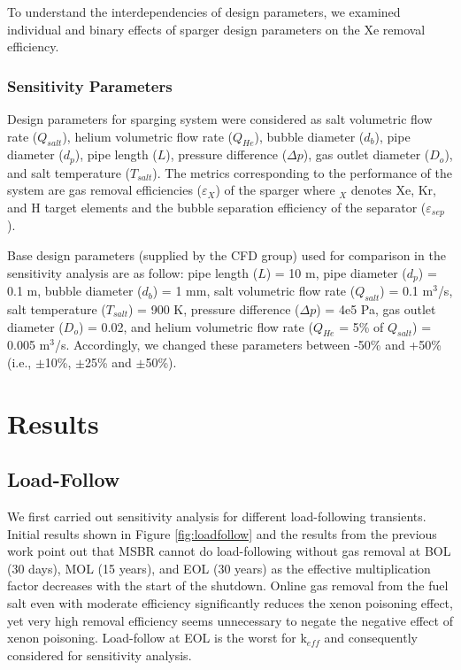 \begin{itemize}
    To understand the interdependencies of design parameters, we examined 
    individual and binary effects of sparger design parameters on the Xe 
    removal efficiency.

\subsubsection{Sensitivity Parameters}

    Design parameters for sparging system were considered as salt volumetric 
    flow rate ($Q_{salt}$), helium volumetric flow rate ($Q_{He}$), bubble 
    diameter ($d_b$), pipe diameter ($d_p$), pipe length ($L$), pressure 
    difference ($\Delta p$), gas outlet diameter ($D_o$), and salt temperature 
    ($T_{salt}$). The metrics corresponding to the performance of the system 
    are gas removal efficiencies ($\varepsilon$$_{X}$) of the sparger where 
    $_{X}$ denotes Xe, Kr, and H target elements and the bubble separation 
    efficiency of the separator ($\varepsilon$$_{sep}$).

    Base design parameters (supplied by the CFD group) used for comparison in 
    the sensitivity analysis are as follow: pipe length ($L$) = 10 m, pipe 
    diameter ($d_p$) = 0.1 m, bubble diameter ($d_b$) = 1 mm, salt volumetric 
    flow rate ($Q_{salt}$) = 0.1 m$^{3}$/s, salt temperature ($T_{salt}$) = 900 
    K, pressure difference ($\Delta p$) = 4e5 Pa, gas outlet diameter ($D_o$) = 
    0.02, and helium volumetric flow rate ($Q_{He}$ = 5\% of $Q_{salt}$) = 
    0.005 m$^{3}$/s. Accordingly, we changed these parameters between -50\% and 
    +50\% (i.e., $\pm$10\%, $\pm$25\% and $\pm$50\%).

\FloatBarrier

\section{Results}

\subsection{Load-Follow}

    We first carried out sensitivity analysis for different load-following 
    transients. Initial results shown in Figure \ref{fig:loadfollow} and the 
    results from the previous work \cite{rykhlevskii_fuel_2020} point out that 
    \gls{MSBR} cannot do load-following without gas removal at BOL (30 days), MOL (15 
    years), and EOL (30 years) as the effective multiplication factor decreases 
    with the start of the shutdown. Online gas removal from the fuel salt even 
    with moderate efficiency significantly reduces the xenon poisoning effect, 
    yet very high removal efficiency seems unnecessary to negate the negative 
    effect of xenon poisoning. Load-follow at EOL is the worst for k$_{eff}$ 
    and consequently considered for sensitivity analysis.


\end{itemize}
